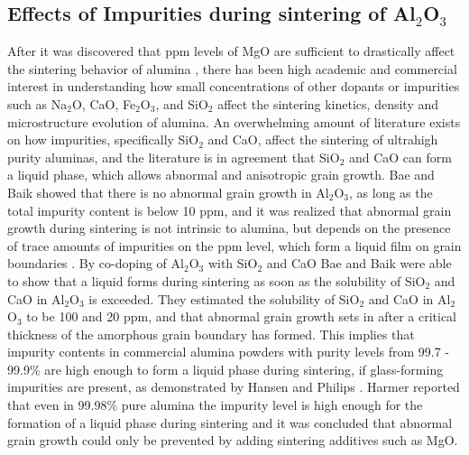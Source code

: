 \subsection{Effects of Impurities during sintering of Al$_{2}$O$_{3}$}
After it was discovered that ppm levels of MgO are sufficient to drastically affect the sintering behavior of alumina \cite{Coble1961,Coble1962,Coble1962a}, there has been high academic and commercial interest in understanding how small concentrations of other dopants or impurities such as Na$_{2}$O, CaO, Fe$_{2}$O$_{3}$, and SiO$_{2}$ affect the sintering kinetics, density and microstructure evolution of alumina. An overwhelming amount of literature exists on how impurities, specifically SiO$_{2}$ and CaO, affect the sintering of ultrahigh purity aluminas, and the literature is in agreement that SiO$_{2}$ and CaO can form a liquid phase, which allows abnormal and anisotropic grain growth. Bae and Baik \cite{Bae1993a,Bae1997} showed that there is no abnormal grain growth in Al$_{2}$O$_{3}$, as long as the total impurity content is below 10 ppm, and it was realized that abnormal grain growth during sintering is not intrinsic to alumina, but depends on the presence of trace amounts of impurities on the ppm level, which form a liquid film on grain boundaries \cite{Bae1994,Handwerker1989,Gavrilov1999,Bennison1990}. By co-doping of Al$_{2}$O$_{3}$ with SiO$_{2}$ and CaO Bae and Baik \cite{Bae1993a} were able to show that a liquid forms during sintering as soon as the solubility of SiO$_{2}$ and CaO in Al$_{2}$O$_{3}$ is exceeded. They estimated the solubility of SiO$_{2}$ and CaO in Al$_{2}$O$_{3}$ to be 100 and 20 ppm, and that abnormal grain growth sets in after a critical thickness of the amorphous grain boundary has formed. This implies that impurity contents in commercial alumina powders with purity levels from 99.7 - 99.9\% are high enough to form a liquid phase during sintering, if glass-forming impurities are present, as demonstrated by Hansen and Philips \cite{Hansen1983}. Harmer \cite{Harmer1984} reported that even in 99.98\% pure alumina the impurity level is high enough for the formation of a liquid phase during sintering and it was concluded that abnormal grain growth could only be prevented by adding sintering additives such as MgO. 

